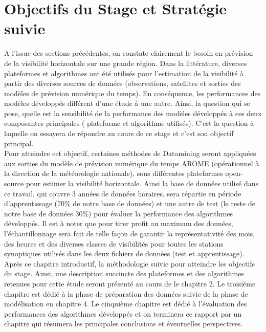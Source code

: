 \section{Objectifs du Stage et Stratégie suivie}
A l’issue des sections précédentes, on constate clairement le besoin en prévision de la visibilité horizontale sur une grande région. Dans la littérature, diverses plateformes et algorithmes ont été utilisés pour l'estimation de la visibilité à partir des diverses sources de données (observations, satellites et sorties des modèles de prévision numérique du temps). En conséquence, les performances des modèles développés différent d'une étude à une autre. Ainsi, la question qui se pose, quelle est la sensibilité de la performance des modèles développés à ces deux composantes principales ( plateforme et algorithme utilisés). C'est la question à laquelle on essayera de répondre au cours de ce stage et c'est son objectif principal.\\

Pour atteindre cet objectif, certaines méthodes de Datamining seront appliquées aux sorties du modèle de prévision numérique du temps AROME (opérationnel à la direction de la météorologie nationale), sous différentes plateformes open-source pour estimer la visibilité horizontale. Ainsi la base de données utilisé dans ce travail, qui couvre 3 années de données horaires, sera répartie en période d’apprentissage (70\% de notre base de données) et une autre de test (le reste de notre base de données 30\%) pour évaluer la performance des algorithmes développés. Il est 
à noter que pour tirer profit au maximum des données, l'échantillonnage sera fait de telle façon de garantir la représentativité des mois, des heures et des diverses classes de visibilités pour toutes les stations synoptiques utilisés dans les deux fichiers de données (test et apprentissage). \\

Après ce chapitre introductif, la méthodologie suivie pour atteindre les objectifs du stage. Ainsi, une description
succincte des plateformes et des algorithmes retenues pour cette étude seront présenté au cours de le chapitre 2. Le
troisième chapitre est dédié à la phase de préparation des données suivie de la phase de modélisation en chapitre 4. Le cinquième chapitre est dédié à l’évaluation des performances
des algorithmes développés et on terminera ce rapport par un chapitre qui résumera les principales conclusions et éventuelles perspectives.










